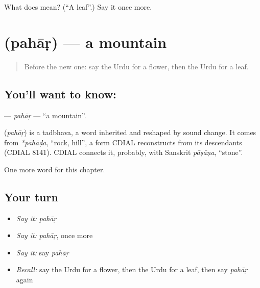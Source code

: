 \begin{tcolorbox}[breakable,colback=teal!4,colframe=teal!35!black,title={Before you move on}]
What does  mean? (\textquotedblleft{}A leaf\textquotedblright{}.) Say it once more.
\end{tcolorbox}
\section[\texorpdfstring{\ur{پہاڑ} (pahāṛ)}{پہاڑ (pahāṛ)}]{ (pahāṛ) — a mountain}

\label{lesson:UR-C64-pahar}



\begin{quote}
Before the new one: say the Urdu for a flower, then the Urdu for a leaf.
\end{quote}

\subsection*{You'll want to know: }
\textbf{} — \emph{pahāṛ} — \textquotedblleft{}a mountain\textquotedblright{}.

\begin{cousinweb}
\textbf{} (\emph{pahāṛ}) is a tadbhava, a word inherited and reshaped by sound change. It comes from \emph{*pāhāḍa}, \textquotedblleft{}rock, hill\textquotedblright{}, a form CDIAL reconstructs from its descendants (CDIAL 8141). CDIAL connects it, probably, with Sanskrit \emph{pāṣāṇa}, \textquotedblleft{}stone\textquotedblright{}.
\end{cousinweb}

\begin{grammarlens}[title={What you've built}]
One more word for this chapter.
\end{grammarlens}

\subsection*{Your turn}
\begin{itemize}
\raggedright
  \item \emph{Say it:} \emph{pahāṛ}
  \item \emph{Say it:} \emph{pahāṛ}, once more
  \item \emph{Say it:} say \emph{pahāṛ}
  \item \emph{Recall:} say the Urdu for a flower, then the Urdu for a leaf, then say \emph{pahāṛ} again
\end{itemize}

